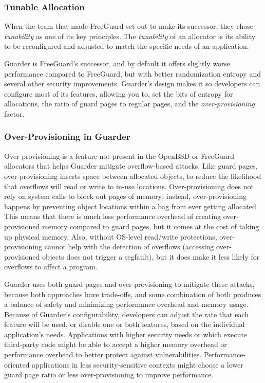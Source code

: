\documentclass[conference]{IEEEtran}
\begin{document}
\subsubsection{Tunable Allocation}

When the team that made FreeGuard set out to make its successor, they chose \emph{tunability} as one of its key principles.
The \emph{tunability} of an allocator is its ability to be reconfigured and adjusted to match the specific needs of an application.

Guarder is FreeGuard's successor, and by default it offers slightly worse performance compared to FreeGuard, but with better randomization entropy and several other security improvements.
Guarder's design makes it so developers can configure most of its features, allowing you to, set the bits of entropy for allocations, the ratio of guard pages to regular pages, and the \emph{over-provisioning} factor.

\subsubsection{Over-Provisioning in Guarder}
Over-provisioning is a feature not present in the OpenBSD or FreeGuard allocators that helps Guarder mitigate overflow-based attacks.
Like guard pages, over-provisioning inserts space between allocated objects, to reduce the likelihood that overflows will read or write to in-use locations.
Over-provisioning does not rely on system calls to block out pages of memory; instead, over-provisioning happens by preventing object locations within a bag from ever getting allocated.
This means that there is much less performance overhead of creating over-provisioned memory compared to guard pages, but it comes at the cost of taking up physical memory.
Also, without OS-level read/write protections, over-provisioning cannot help with the detection of overflows (accessing over-provisioned objects does not trigger a segfault), but it does make it less likely for overflows to affect a program.

Guarder uses both guard pages and over-provisioning to mitigate these attacks, because both approaches have trade-offs, and some combination of both produces a balance of safety and minimizing performance overhead and memory usage.
Because of Guarder's configurability, developers can adjust the rate that each feature will be used, or disable one or both features, based on the individual application's needs.
Applications with higher security needs or which execute third-party code might be able to accept a higher memory overhead or performance overhead to better protect against vulnerabilities.
Performance-oriented applications in less security-sensitive contexts might choose a lower guard page ratio or less over-provisioning to improve performance.
\end{document}
